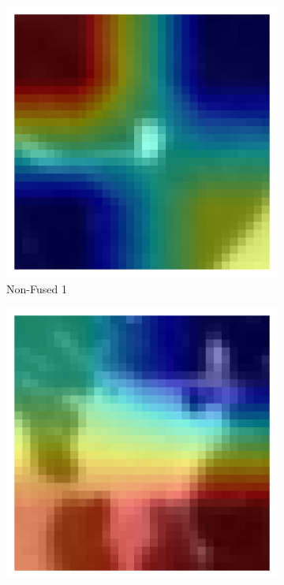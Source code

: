 \begin{figure}[htbp]
    \begin{subfigure}[b]{0.18\textwidth}
        \centering
        \includegraphics[width=\linewidth]{figures/heatmaps/ex1/sample_gradcam_non_fused.png}
        \caption*{Non-Fused 1}
    \end{subfigure}
    \begin{subfigure}[b]{0.18\textwidth}
        \centering
        \includegraphics[width=\linewidth]{figures/heatmaps/ex2/sample_gradcam_non_fused.png}

\end{subfigure}
\end{figure}
